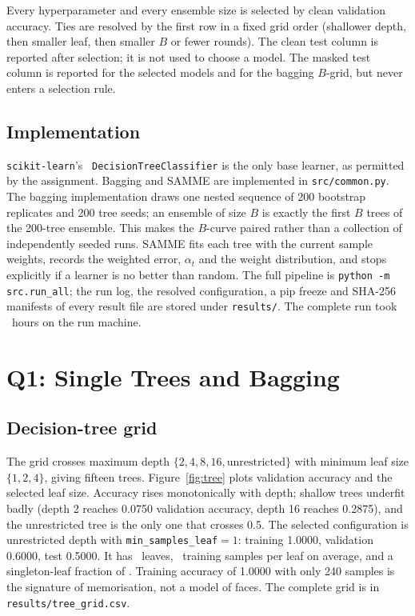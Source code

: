 \documentclass[10pt,twocolumn,letterpaper]{article}
\begin{document}
Every hyperparameter and every ensemble size is selected by clean validation
accuracy.  Ties are resolved by the first row in a fixed grid order (shallower
depth, then smaller leaf, then smaller $B$ or fewer rounds).  The clean test
column is reported after selection; it is not used to choose a model.  The
masked test column is reported for the selected models and for the bagging
$B$-grid, but never enters a selection rule.

\subsection{Implementation}

\texttt{scikit-learn}'s~\cite{pedregosa2011}
\texttt{DecisionTreeClassifier} is the only base
learner, as permitted by the assignment.  Bagging and SAMME are implemented in
\texttt{src/common.py}.  The bagging implementation draws one nested sequence of
200 bootstrap replicates and 200 tree seeds; an ensemble of size $B$ is exactly
the first $B$ trees of the 200-tree ensemble.  This makes the $B$-curve paired
rather than a collection of independently seeded runs.  SAMME fits each tree
with the current sample weights, records the weighted error, $\alpha_t$ and the
weight distribution, and stops explicitly if a learner is no better than
random.  The full pipeline is \texttt{python -m src.run\_all}; the run log, the
resolved configuration, a pip freeze and SHA-256 manifests of every result file
are stored under \texttt{results/}.  The complete run took
\RuntimeHours~hours on the run machine.

\section{Q1: Single Trees and Bagging}

\subsection{Decision-tree grid}

The grid crosses maximum depth $\{2,4,8,16,\text{unrestricted}\}$ with minimum
leaf size $\{1,2,4\}$, giving fifteen trees.  Figure~\ref{fig:tree} plots
validation accuracy and the selected leaf size.  Accuracy rises monotonically
with depth; shallow trees underfit badly (depth 2 reaches 0.0750 validation
accuracy, depth 16 reaches 0.2875), and the unrestricted tree is the only one
that crosses 0.5.  The selected configuration is unrestricted depth with
\texttt{min\_samples\_leaf}$=1$: training 1.0000, validation 0.6000, test
0.5000.  It has \TreeLeaves~leaves, \TreeMeanLeaf~training samples per leaf on
average, and a singleton-leaf fraction of \TreeSingleton.  Training accuracy of
1.0000 with only 240 samples is the signature of memorisation, not a model of
faces.  The complete grid is in \texttt{results/tree\_grid.csv}.
\end{document}
